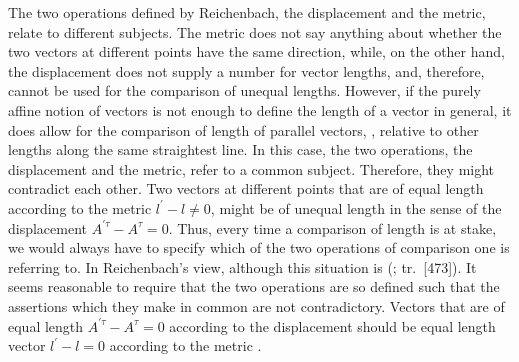 \documentclass[submitted]{article}
\renewcommand{\rzlap}[2]{(\cite[#1]{Reichenbach1928}; tr.\ [#2])\xspace}
\begin{document}
The two operations defined by Reichenbach, the displacement and the metric, relate to different subjects. The metric does not say anything about whether the two vectors at different points have the same direction, while, on the other hand, the displacement does not supply a number for vector lengths, and, therefore, cannot be used for the comparison of unequal lengths. However, if the purely affine notion of vectors is not enough to define the length of a vector in general, it does allow for the comparison of length of parallel vectors, \ie, relative to other lengths along the same straightest line. In this case, the two operations, the displacement and the metric, refer to a common subject. Therefore, they might contradict each other. Two vectors at different points that are of equal length according to the metric $l^{\prime}-l \neq 0$, might be of unequal length in the sense of the displacement $A^{\prime \tau}-A^{\tau}=0$. Thus, every time a comparison of length is at stake, we would always have to specify which of the two operations of comparison one is referring to. In Reichenbach's view, although this situation is  \rzlap{339}{473}. It seems reasonable to require that the two operations are so defined such that the assertions which they make in common are not contradictory. Vectors that are of equal length $A^{\prime \tau}-A^{\tau}=0$ according to the displacement should be equal length vector $l^{\prime}-l = 0$ according to the metric .
\end{document}
